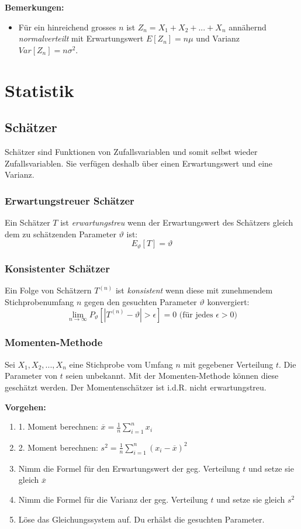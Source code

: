 \documentclass[10pt,a4paper,twocolumn]{article}
\begin{document}
\textbf{Bemerkungen:}
\begin{itemize}
\item Für ein hinreichend grosses $n$ ist $Z_n=X_1+X_2+...+X_n$ annähernd \emph{normalverteilt} mit Erwartungswert $E[Z_n]=n\mu$ und Varianz $Var[Z_n]=n\sigma^2$.
\end{itemize}

\section{Statistik}

\subsection{Schätzer}
Schätzer sind Funktionen von Zufallsvariablen und somit selbst wieder Zufallsvariablen. Sie verfügen deshalb über einen Erwartungswert und eine Varianz.

\subsubsection{Erwartungstreuer Schätzer}
Ein Schätzer $T$ ist \emph{erwartungstreu} wenn der Erwartungswert des Schätzers gleich dem zu schätzenden Parameter $\vartheta$ ist:
\[
E_\vartheta [T] = \vartheta
\]

\subsubsection{Konsistenter Schätzer}
Ein Folge von Schätzern $T^{(n)}$ ist \emph{konsistent} wenn diese mit zunehmendem Stichprobenumfang $n$ gegen den gesuchten Parameter $\vartheta$ konvergiert:
\[
\lim_{n\to\infty}P_{\vartheta}\left[|T^{(n)}-\vartheta| > \epsilon\right] = 0\text{ (für jedes $\epsilon > 0$)}
\]

\subsubsection{Momenten-Methode}
Sei $X_1,X_2,...,X_n$ eine Stichprobe vom Umfang $n$ mit gegebener Verteilung $t$. Die Parameter von $t$ seien unbekannt. Mit der Momenten-Methode können diese geschätzt werden. Der Momentenschätzer ist i.d.R. nicht erwartungstreu.

\vspace{10pt}

\textbf{Vorgehen:}
\begin{enumerate}
\item 1. Moment berechnen: $\overline{x} = \frac{1}{n}\sum\limits_{i=1}^{n}x_i$
\item 2. Moment berechnen: $s^2 = \frac{1}{n}\sum\limits_{i=1}^{n}\left(x_i - \overline{x}\right)^2$
\item Nimm die Formel für den Erwartungswert der geg. Verteilung $t$ und setze sie gleich $\overline{x}$
\item Nimm die Formel für die Varianz der geg. Verteilung $t$ und setze sie gleich $s^2$
\item Löse das Gleichungssystem auf. Du erhälst die gesuchten Parameter.
\end{enumerate}
\end{document}
